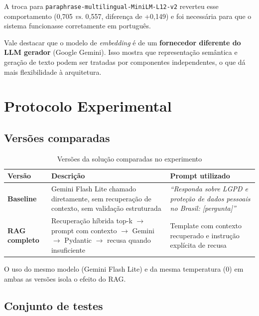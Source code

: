 \documentclass[
  12pt,
  a4paper,
  brazil,
  article,
  oneside,
  sumario=tradicional
]{abntex2}
\begin{document}
A troca para \texttt{paraphrase-multilingual-MiniLM-L12-v2} reverteu esse
comportamento (0,705 \textit{vs.} 0,557, diferença de +0,149) e foi necessária para
que o sistema funcionasse corretamente em português.

Vale destacar que o modelo de \textit{embedding} é de um \textbf{fornecedor diferente
do LLM gerador} (Google Gemini). Isso mostra que representação semântica e geração de
texto podem ser tratadas por componentes independentes, o que dá mais flexibilidade à
arquitetura.

\section{Protocolo Experimental}

\subsection{Versões comparadas}

\begin{table}[H]
\caption{Versões da solução comparadas no experimento}
\label{tab:versoes}
\centering\small
\begin{tabularx}{\textwidth}{p{2.4cm}XX}
\toprule
\textbf{Versão} & \textbf{Descrição} & \textbf{Prompt utilizado} \\
\midrule
\textbf{Baseline} & Gemini Flash Lite chamado diretamente, sem recuperação de contexto, sem validação estruturada & \emph{``Responda sobre LGPD e proteção de dados pessoais no Brasil: [pergunta]''} \\
\textbf{RAG completo} & Recuperação híbrida top-k $\to$ prompt com contexto $\to$ Gemini $\to$ Pydantic $\to$ recusa quando insuficiente & Template com contexto recuperado e instrução explícita de recusa \\
\bottomrule
\end{tabularx}
\end{table}

O uso do mesmo modelo (Gemini Flash Lite) e da mesma temperatura (0) em ambas as
versões isola o efeito do RAG.

\subsection{Conjunto de testes}
\end{document}
